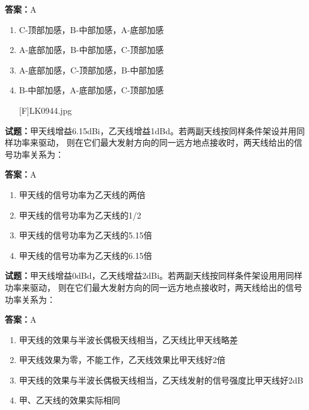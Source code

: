 \documentclass{ctexbook}
\begin{document}
\textbf{答案：}A 

\begin{enumerate}[leftmargin=3em]
  \item C-顶部加感，B-中部加感，A-底部加感 

  \item A-底部加感，B-中部加感，C-顶部加感 

  \item A-底部加感，C-顶部加感，B-中部加感 

  \item B-中部加感，A-底部加感，C-顶部加感 

[F]LK0944.jpg 

\end{enumerate}





\vspace{1em}

\textbf{试题：}甲天线增益6.15dBi，乙天线增益1dBd。若两副天线按同样条件架设并用同样功率来驱动，
则在它们最大发射方向的同一远方地点接收时，两天线给出的信号功率关系为： 

\textbf{答案：}A 

\begin{enumerate}[leftmargin=3em]
  \item 甲天线的信号功率为乙天线的两倍 

  \item 甲天线的信号功率为乙天线的1/2 

  \item 甲天线的信号功率为乙天线的5.15倍 

  \item 甲天线的信号功率为乙天线的6.15倍 

\end{enumerate}






\vspace{1em}

\textbf{试题：}甲天线增益0dBd，乙天线增益2dBi。若两副天线按同样条件架设用用同样功率来驱动，
则在它们最大发射方向的同一远方地点接收时，两天线给出的信号功率关系为： 

\textbf{答案：}A 

\begin{enumerate}[leftmargin=3em]
  \item 甲天线的效果与半波长偶极天线相当，乙天线比甲天线略差 

  \item 甲天线效果为零，不能工作，乙天线效果比甲天线好2倍 

  \item 甲天线的效果与半波长偶极天线相当，乙天线发射的信号强度比甲天线好2dB 

  \item 甲、乙天线的效果实际相同 

\end{enumerate}
\end{document}
